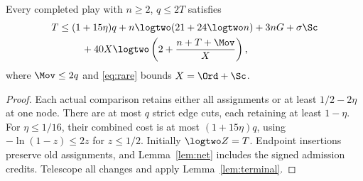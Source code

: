 \begin{theorem}
\label{thm:fixed}
Every completed play with $n\geq2$, $q\leq2T$ satisfies
\begin{equation}
\begin{split}
T\leq{}&(1+15\eta)q+n\logtwo(21+24\logtwo n)+3nG+\sigma\Sc\\
       &\quad+40X\logtwo\left(2+\frac{n+T+\Mov}{X}\right),
\end{split}
\label{eq:master}
\end{equation}
where $\Mov\leq2q$ and \eqref{eq:rare} bounds $X=\Ord+\Sc$.
\end{theorem}
\begin{proof}
Each actual comparison retains either all assignments or at least
$1/2-2\eta$ at one node. There are at most $q$ strict edge cuts, each
retaining at least $1-\eta$. For $\eta\leq1/16$, their combined cost is
at most $(1+15\eta)q$, using $-\ln(1-z)\leq2z$ for $z\leq1/2$.
Initially $\logtwo Z=T$. Endpoint insertions preserve old assignments,
and Lemma~\ref{lem:net} includes the signed admission credits.
Telescope all changes and apply Lemma~\ref{lem:terminal}.
\end{proof}
